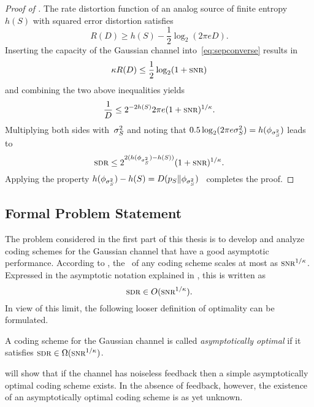 \begin{proof}[Proof of ]
  The rate distortion function of an analog source of finite entropy~$h(S)$
  with squared error distortion satisfies~\cite{Shannon1959}
  \begin{equation*}
    R(D) \ge h(S) - \frac12 \log_2(2\pi e D).
  \end{equation*}
  Inserting the capacity of the Gaussian channel into~\eqref{eq:sepconverse}
  results in
  \begin{equation*}
    \k R(D) \le \frac12 \log_2(1 + \snr)
  \end{equation*}
  and combining the two above inequalities yields
  \begin{equation*}
    \frac1D \le 2^{-2h(S)} 2\pi e (1 + \snr)^{1/\k}.
  \end{equation*}
  Multiplying both sides with~${\sigma_S^2}$ and noting that $0.5 \log_2(2\pi e {\sigma_S^2}) =
  h(\phi_{{\sigma_S^2}})$ leads to
  \begin{equation*}
    \sdr \le 2^{2(h(\phi_{\ssq}) - h(S))} (1 + \snr)^{1/\k}.
  \end{equation*}
  Applying the property $h(\phi_{{\sigma_S^2}}) - h(S) = D({p_S} \|
  \phi_{{\sigma_S^2}})$~\cite[Theorem~8.6.5]{CoverT1991} completes the proof.
\end{proof}


\subsection{Formal Problem Statement}

The problem considered in the first part of this thesis is to develop and
analyze coding schemes for the Gaussian channel that have a good asymptotic
performance. According to , the \sdr\ of any coding scheme scales
at most as $\snr^{1/\k}$. Expressed in the asymptotic notation explained in
, this is written as
\begin{equation*}
  \sdr \in O(\snr^{1/\k}).
\end{equation*}
In view of this limit, the following looser definition of optimality can be
formulated. 
\begin{definition}
  A coding scheme for the Gaussian channel is called \emph{asymptotically
  optimal} if it satisfies $\sdr \in \Omega(\snr^{1/\k})$.
\end{definition}
 will show that if the channel has noiseless feedback then a
simple asymptotically optimal coding scheme exists. In the absence of feedback,
however, the existence of an asymptotically optimal coding scheme is as yet
unknown.

